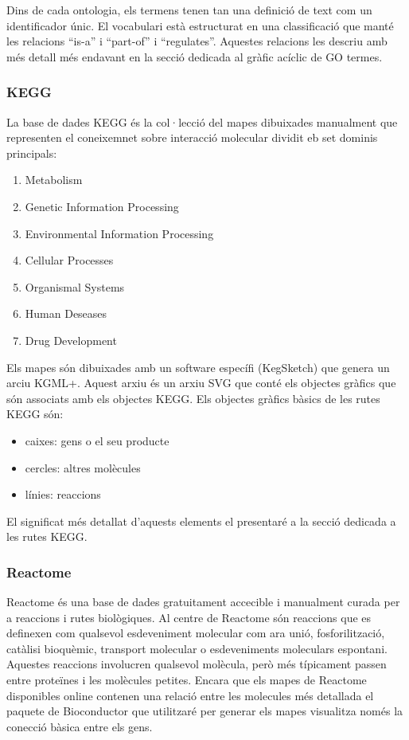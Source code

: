 \documentclass[]{article}
\begin{document}
Dins de cada ontologia, els termens tenen tan una definició de text com un identificador únic. El vocabulari està estructurat en una classificació que manté les relacions ``is-a'' i ``part-of'' i ``regulates''. Aquestes relacions les descriu amb més detall més endavant en la secció dedicada al gràfic acíclic de GO termes.

\subsubsection{KEGG}
La base de dades KEGG és la col·lecció del mapes dibuixades manualment que representen el coneixemnet sobre interacció molecular dividit eb set dominis principals:
\begin{enumerate}
\item Metabolism
\item Genetic Information Processing
\item Environmental Information Processing
\item Cellular Processes
\item Organismal Systems
\item Human Deseases
\item Drug Development
\end{enumerate}

Els mapes són dibuixades amb un software específi (KegSketch) que genera un arciu KGML+. Aquest arxiu és un arxiu SVG que conté els objectes gràfics que són associats amb els objectes KEGG. Els objectes gràfics bàsics de les rutes KEGG són:
\begin{itemize}
\item caixes: gens o el seu producte
\item cercles: altres molècules
\item línies: reaccions
\end{itemize}
 
El significat més detallat d'aquests elements el presentaré a la secció dedicada a les rutes KEGG.

\subsubsection{Reactome}

Reactome és una base de dades gratuitament accecible i manualment curada per a reaccions i rutes biològiques. Al centre de Reactome són reaccions que es definexen com qualsevol esdeveniment molecular com ara unió, fosforilització, catàlisi bioquèmic, transport molecular o esdeveniments moleculars espontani. Aquestes reaccions involucren qualsevol molècula, però més típicament passen entre proteïnes i les molècules petites. Encara que els mapes de Reactome disponibles online contenen una relació entre les molecules més detallada el paquete de Bioconductor que utilitzaré per generar els mapes visualitza només la conecció bàsica entre els gens. 
\end{document}
